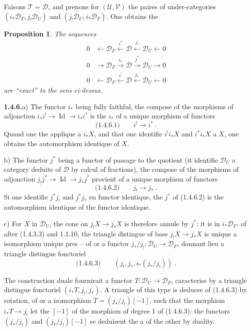 \documentclass[12pt,a4paper]{article}
\theoremstyle{plain}
\newtheorem{proposition}[theorem]{Proposition}
\theoremstyle{definition}
\DeclareMathOperator{\Id}{Id}
\begin{document}
Faisons $\mathcal{T} = \mathcal{D}$, and prenons for $(\mathcal{U},\mathcal{V})$ the paires of under-categories $(i_*\mathcal{D}_F, j_!\mathcal{D}_U)$ and $(j_!\mathcal{D}_U, i_*\mathcal{D}_F)$. One obtains the

\begin{proposition}\label{prop:1.4.5}
The sequences
\begin{align*}
0 &\longleftarrow \mathcal{D}_F \xleftarrow{\,i^*\,} \mathcal{D} \xleftarrow{\,j_!\,} \mathcal{D}_U \longleftarrow 0 \\
0 &\longrightarrow \mathcal{D}_F \xrightarrow{\,i_*\,} \mathcal{D} \xrightarrow{\,j^*\,} \mathcal{D}_U \longrightarrow 0 \\
0 &\longleftarrow \mathcal{D}_F \xleftarrow{\,i^!\,} \mathcal{D} \xleftarrow{\,j_*\,} \mathcal{D}_U \longleftarrow 0
\end{align*}
are ``exact'' to the sens ci-dessus.
\end{proposition}

\smallskip
\noindent\textbf{1.4.6.}\quad a) The functor $i_*$ being fully faithful, the compose of the morphisms of adjonction $i_*i^! \to \Id \to i_*i^*$ is the $i_*$ of a unique morphism of functors
\[
\text{(1.4.6.1)}\qquad i^! \longrightarrow i^*\;.
\]
Quand one the applique a $i_*X$, and that one identifie $i^!i_*X$ and $i^*i_*X$ a $X$, one obtains the automorphism identique of $X$.

b) The functor $j^*$ being a functor of passage to the quotient (it identifie $\mathcal{D}_U$ a category deduite of $\mathcal{D}$ by calcul of fractions), the compose of the morphisms of adjonction $j_!j^* \to \Id \to j_*j^*$ provient of a unique morphism of functors
\[
\text{(1.4.6.2)}\qquad j_! \longrightarrow j_*\;.
\]
Si one identifie $j^*j_!$ and $j^*j_*$ en functor identique, the $j^*$ of (1.4.6.2) is the automorphism identique of the functor identique.

c) For $X$ in $\mathcal{D}_U$, the cone on $j_!X \to j_*X$ is therefore annule by $j^*$: it is in $i_*\mathcal{D}_F$. of after (1.4.3.3) and 1.1.10, the triangle distingue of base $j_!X \to j_*X$ is unique a isomorphism unique pres -- of or a functor $j_*/j_! : \mathcal{D}_U \to \mathcal{D}_F$, donnant lieu a triangle distingue fonctoriel
\[
\text{(1.4.6.3)}\qquad (j_!, j_*, i_*(j_*/j_!))\;.
\]

The construction duale fournirait a functor $T : \mathcal{D}_U \to \mathcal{D}_F$, caracterise by a triangle distingue fonctoriel $(i_*T, j_!, j_*)$. A triangle of this type is deduces of (1.4.6.3) by rotation, of or a isomorphism $T = (j_*/j_!)[-1]$, such that the morphism $i_*T \to j_!$ let the $[-1]$ of the morphism of degree 1 of (1.4.6.3): the functors $(j_*/j_!)$ and $(j_*/j_!)[-1]$ se deduisent the a of the other by duality.
\end{document}
